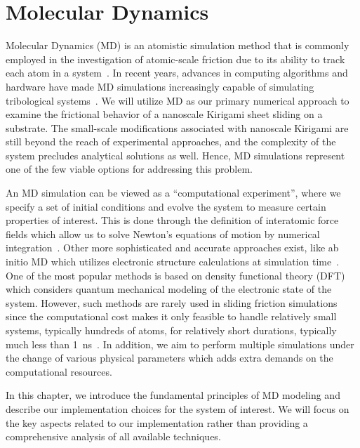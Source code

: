 \chapter{Molecular Dynamics}\label{chap:MD}
Molecular Dynamics (\acrshort{MD}) is an atomistic simulation method that is commonly employed in the investigation of atomic-scale friction due to its ability to track each atom in a system~\cite{Yalin_2011}. In recent years, advances in computing algorithms and hardware have made \acrshort{MD} simulations increasingly capable of simulating tribological systems~\cite{Manini_2016}. We will utilize \acrshort{MD} as our primary numerical approach to examine the frictional behavior of a nanoscale Kirigami sheet sliding on a substrate. The small-scale modifications associated with nanoscale Kirigami are still beyond the reach of experimental approaches, and the complexity of the system precludes analytical solutions as well. Hence, \acrshort{MD} simulations represent one of the few viable options for addressing this problem.

An \acrshort{MD} simulation can be viewed as a ``computational experiment'', where we specify a set of initial conditions and evolve the system to measure certain properties of interest. This is done through the definition of interatomic force fields which allow us to solve Newton's equations
of motion by numerical integration~\cite[p. 303]{BHUSHAN20051507}. Other more sophisticated and accurate approaches exist, like ab initio \acrshort{MD} which utilizes electronic structure calculations at simulation time~\cite{carloni_role_2002}. One of the most popular methods is based on density functional theory (DFT)~\cite{PhysRev.136.B864} which considers quantum mechanical modeling of the electronic state of the system. However, such methods are rarely used in sliding friction simulations since the computational cost makes it only feasible to handle relatively small systems, typically hundreds of atoms, for relatively short durations, typically much less than \SI{1}{ns}~\cite{Vanossi_2013}. In addition, we aim to perform multiple simulations under the
change of various physical parameters which adds extra demands on the computational resources.

In this chapter, we introduce the fundamental principles of \acrshort{MD} modeling and describe our implementation choices for the system of interest. We will focus on the key aspects related to our implementation rather than providing a comprehensive analysis of all available techniques.





